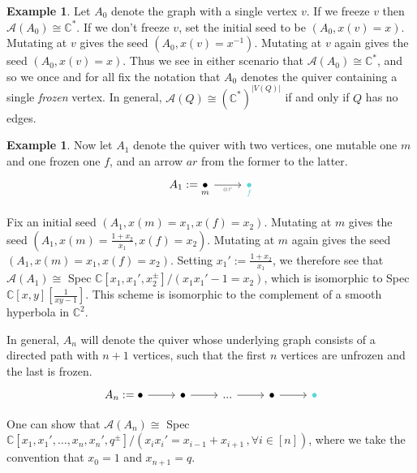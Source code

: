 \documentclass[11pt]{amsart}
\theoremstyle{definition}
\newtheorem{exmp}[thm]{Example}
\theoremstyle{remark}
\numberwithin{equation}{section}
\begin{document}
\begin{exmp}\label{a1 quiver}
    Let $A_0$ denote the graph with a single vertex $v$. If we freeze $v$ then $\mathcal{A}(A_0) \cong \mathbb{C}^*$. If we don't freeze $v$, set the initial seed to be $(A_0, x(v) = x)$. Mutating at $v$ gives the seed $(A_0, x(v) = x^{-1})$. Mutating at $v$ again gives the seed $(A_0, x(v) = x)$. Thus we see in either scenario that $\mathcal{A}(A_0) \cong \mathbb{C}^*$, and so we once and for all fix the notation that $A_0$ denotes the quiver containing a single \textit{frozen} vertex. In general, $\mathcal{A}(Q) \cong (\mathbb{C}^*)^{|V(Q)|}$ if and only if $Q$ has no edges.

    \begin{exmp}
        Now let $A_1$ denote the quiver with two vertices, one mutable one $m$ and one frozen one $f$, and an arrow $ar$ from the former to the latter.
\[\begin{tikzcd}
    A_1 := \underset{m}{\bullet} & \textcolor{rgb,255:red,92;green,214;blue,214}{\underset{f}{\bullet}}
	\arrow[from=1-1, to=1-2, "\textcolor{gray}{ar}"']
\end{tikzcd}\]

Fix an initial seed $(A_1, x(m) = x_1, x(f) = x_2)$. Mutating at $m$ gives the seed $(A_1, x(m) = \frac{1 + x_2}{x_1}, x(f) = x_2)$. Mutating at $m$ again gives the seed $(A_1, x(m) = x_1, x(f) = x_2)$. Setting $x_1' := \frac{1 + x_2}{x_1}$, we therefore see that $\mathcal{A}(A_1) \cong$ Spec $\mathbb{C}[x_1, x_1', x_2^\pm]/(x_1x_1' - 1 = x_2)$, which is isomorphic to Spec $\mathbb{C}[x, y][\frac{1}{xy - 1}]$. This scheme is isomorphic to the complement of a smooth hyperbola in $\mathbb{C}^2$. 
    \end{exmp}

In general, $A_n$ will denote the quiver whose underlying graph consists of a directed path with $n + 1$ vertices, such that the first $n$ vertices are unfrozen and the last is frozen.
\[\begin{tikzcd}
	A_n := \bullet & \bullet & {...} & \bullet & \textcolor{rgb,255:red,92;green,214;blue,214}{\bullet}
	\arrow[from=1-1, to=1-2]
	\arrow[from=1-2, to=1-3]
	\arrow[from=1-3, to=1-4]
	\arrow[from=1-4, to=1-5]
\end{tikzcd}\]

One can show that $\mathcal{A}(A_n) \cong$ Spec $\mathbb{C}[x_1, x_1', \dots, x_n, x_n', q^{\pm}]/(x_ix_i' = x_{i-1} + x_{i+1}\,,\forall i \in [n])$, where we take the convention that $x_0 = 1$ and $x_{n+1} = q$.
\end{exmp}
\end{document}
